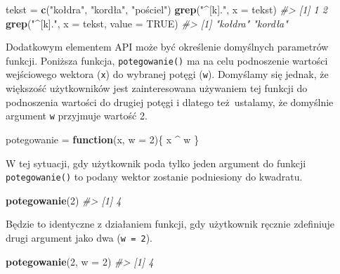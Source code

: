 \documentclass[paper=6in:9in,pagesize=pdftex,headinclude=on,footinclude=on,10pt]{scrbook}
\newenvironment{Shaded}{\begin{snugshade}}{\end{snugshade}}
\newcommand{\CommentTok}[1]{\textcolor[rgb]{0.56,0.35,0.01}{\textit{#1}}}
\newcommand{\ControlFlowTok}[1]{\textcolor[rgb]{0.13,0.29,0.53}{\textbf{#1}}}
\newcommand{\DataTypeTok}[1]{\textcolor[rgb]{0.13,0.29,0.53}{#1}}
\newcommand{\DecValTok}[1]{\textcolor[rgb]{0.00,0.00,0.81}{#1}}
\newcommand{\KeywordTok}[1]{\textcolor[rgb]{0.13,0.29,0.53}{\textbf{#1}}}
\newcommand{\NormalTok}[1]{#1}
\newcommand{\OperatorTok}[1]{\textcolor[rgb]{0.81,0.36,0.00}{\textbf{#1}}}
\newcommand{\OtherTok}[1]{\textcolor[rgb]{0.56,0.35,0.01}{#1}}
\newcommand{\StringTok}[1]{\textcolor[rgb]{0.31,0.60,0.02}{#1}}
\begin{document}
\begin{Shaded}
\begin{Highlighting}[]
\NormalTok{tekst =}\StringTok{ }\KeywordTok{c}\NormalTok{(}\StringTok{"kołdra"}\NormalTok{, }\StringTok{"kordła"}\NormalTok{, }\StringTok{"pościel"}\NormalTok{)}
\KeywordTok{grep}\NormalTok{(}\StringTok{"^[k]."}\NormalTok{, }\DataTypeTok{x =}\NormalTok{ tekst)}
\CommentTok{#> [1] 1 2}
\KeywordTok{grep}\NormalTok{(}\StringTok{"^[k]."}\NormalTok{, }\DataTypeTok{x =}\NormalTok{ tekst, }\DataTypeTok{value =} \OtherTok{TRUE}\NormalTok{)}
\CommentTok{#> [1] "kołdra" "kordła"}
\end{Highlighting}
\end{Shaded}

Dodatkowym elementem API może być określenie domyślnych parametrów funkcji.
Poniższa funkcja, \texttt{potegowanie()} ma na celu podnoszenie wartości wejściowego wektora (\texttt{x}) do wybranej potęgi (\texttt{w}).
Domyślamy się jednak, że większość użytkowników jest zainteresowana używaniem tej funkcji do podnoszenia wartości do drugiej potęgi i dlatego też~ustalamy, że domyślnie argument \texttt{w} przyjmuje wartość 2.

\begin{Shaded}
\begin{Highlighting}[]
\NormalTok{potegowanie =}\StringTok{ }\ControlFlowTok{function}\NormalTok{(x, }\DataTypeTok{w =} \DecValTok{2}\NormalTok{)\{}
\NormalTok{  x }\OperatorTok{^}\StringTok{ }\NormalTok{w}
\NormalTok{\}}
\end{Highlighting}
\end{Shaded}

W tej sytuacji, gdy użytkownik poda tylko jeden argument do funkcji \texttt{potegowanie()} to podany wektor zostanie podniesiony do kwadratu.

\begin{Shaded}
\begin{Highlighting}[]
\KeywordTok{potegowanie}\NormalTok{(}\DecValTok{2}\NormalTok{)}
\CommentTok{#> [1] 4}
\end{Highlighting}
\end{Shaded}

Będzie to identyczne z działaniem funkcji, gdy użytkownik ręcznie zdefiniuje drugi argument jako dwa (\texttt{w\ =\ 2}).

\begin{Shaded}
\begin{Highlighting}[]
\KeywordTok{potegowanie}\NormalTok{(}\DecValTok{2}\NormalTok{, }\DataTypeTok{w =} \DecValTok{2}\NormalTok{)}
\CommentTok{#> [1] 4}
\end{Highlighting}
\end{Shaded}
\end{document}
